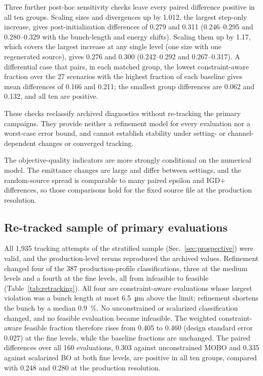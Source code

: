 \documentclass[aps,prab,reprint,superscriptaddress,amsmath,amssymb,floatfix]{revtex4-2}
\begin{document}
Three further post-hoc sensitivity checks leave every paired difference positive in all ten
groups. Scaling sizes and divergences up by 1.012, the largest step-only increase, gives
post-initialization differences of 0.279 and 0.311 (0.246--0.295 and 0.280--0.329 with the
bunch-length and energy shifts). Scaling them up by 1.17, which covers the largest increase at
any single level (one size with one regenerated source), gives 0.276 and 0.300 (0.242--0.292 and
0.267--0.317). A differential case that pairs, in each matched group, the lowest
constraint-aware fraction over the 27 scenarios with the highest fraction of each baseline gives
mean differences of 0.166 and 0.211; the smallest group differences are 0.062 and 0.132, and all
ten are positive.

These checks reclassify archived diagnostics without re-tracking the primary campaigns. They
provide neither a refinement model for every evaluation nor a worst-case error bound, and cannot
establish stability under setting- or channel-dependent changes or converged tracking.

The objective-quality indicators are more strongly conditional on the numerical model. The
emittance changes are large and differ between settings, and the random-source spread is
comparable to many paired epsilon and IGD+ differences, so those comparisons hold for the fixed
source file at the production resolution.

\subsection{Re-tracked sample of primary evaluations}
\label{sec:retracking}
All 1,935 tracking attempts of the stratified sample (Sec.~\ref{sec:prospective}) were valid,
and the production-level reruns reproduced the archived values. Refinement changed four of the
387 production-profile classifications, three at the medium levels and a fourth at the fine
levels, all from infeasible to feasible (Table~\ref{tab:retracking}). All four are
constraint-aware evaluations whose largest violation was a bunch length at most
\SI{6.5}{\micro\metre} above the limit; refinement shortens the bunch by a median
\SI{0.9}{\percent}. No unconstrained or scalarized classification changed, and no feasible
evaluation became infeasible. The weighted constraint-aware feasible fraction therefore rises
from 0.405 to 0.460 (design standard error 0.027) at the fine levels, while the baseline
fractions are unchanged. The paired differences over all 160 evaluations, 0.303 against
unconstrained MOBO and 0.335 against scalarized BO at both fine levels, are positive in all ten
groups, compared with 0.248 and 0.280 at the production resolution.
\end{document}
